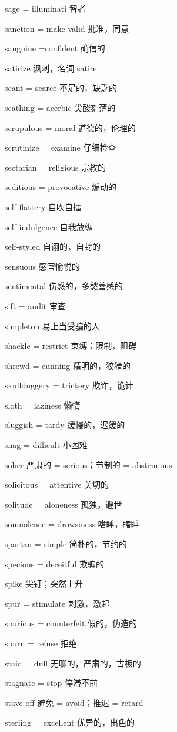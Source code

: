 \documentclass[UTF8, fontset = none, zihao = -4, linespread = 1.1]{ctexart}
\begin{document}
\begin{multicols}{2}
sage = illuminati 智者

sanction = make valid 批准，同意

sanguine =confident 确信的

satirize 讽刺，名词 satire

scant = scarce 不足的，缺乏的

scathing = acerbic 尖酸刻薄的

scrupulous = moral 道德的，伦理的

scrutinize = examine 仔细检查

sectarian = religious 宗教的

seditious = provocative 煽动的

self-flattery 自吹自擂

self-indulgence 自我放纵

self-styled 自诩的，自封的

sensuous 感官愉悦的

sentimental 伤感的，多愁善感的

sift = audit 审查

simpleton 易上当受骗的人

shackle = restrict 束缚；限制，阻碍

shrewd = cunning 精明的，狡猾的

skullduggery = trickery 欺诈，诡计

sloth = laziness 懒惰

sluggish = tardy 缓慢的，迟缓的

snag = difficult 小困难

sober 严肃的 = serious；节制的 = abstemious

solicitous = attentive 关切的

solitude = aloneness 孤独，避世

somnolence = drowsiness 嗜睡，瞌睡

spartan = simple 简朴的，节约的

specious = deceitful 欺骗的

spike 尖钉；突然上升

spur = stimulate 刺激，激起

spurious = counterfeit 假的，伪造的

spurn = refuse 拒绝

staid = dull 无聊的，严肃的，古板的

stagnate = stop 停滞不前

stave off 避免 = avoid；推迟 = retard

sterling = excellent 优异的，出色的


\end{multicols}
\end{document}

